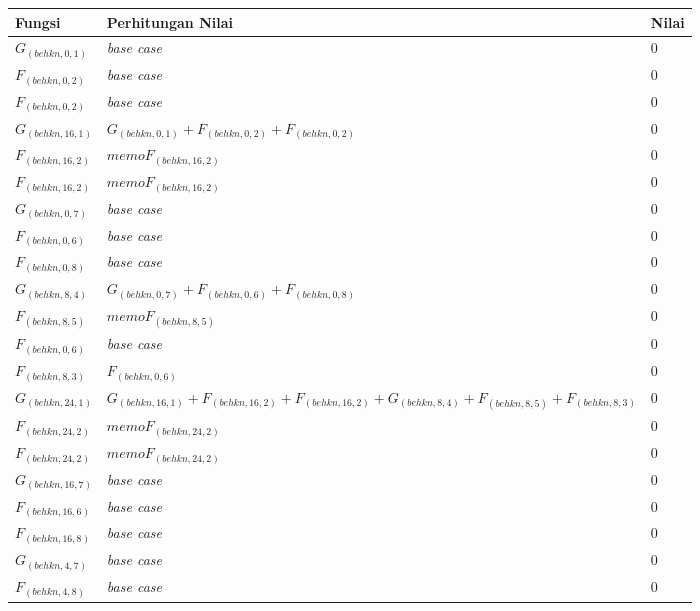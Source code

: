 \begin{appendices}
  \begin{table}[H]
  	\centering
  	\begin{tabular} {|p{3cm}|p{5cm}|p{1cm}|} \hline
  		Fungsi & Perhitungan Nilai & Nilai \\ \hline
  		$ G_{(behkn, 0, 1)} $ & \textit{base case} & $ 0 $ \\ \hline
  		$ F_{(behkn, 0, 2)} $ & \textit{base case} & $ 0 $ \\ \hline
  		$ F_{(behkn, 0, 2)} $ & \textit{base case} & $ 0 $ \\ \hline
  		$ G_{(behkn, 16, 1)}  $ & $G_{(behkn, 0, 1)} + F_{(behkn, 0, 2)} + F_{(behkn, 0, 2)}$ & $ 0 $ \\ \hline
  		$ F_{(behkn, 16, 2)}  $ & $memoF_{(behkn, 16, 2)}$ & $ 0 $ \\ \hline
  		$ F_{(behkn, 16, 2)}  $ & $memoF_{(behkn, 16, 2)}$ & $ 0 $ \\ \hline
  		$ G_{(behkn, 0, 7)} $ & \textit{base case} & $ 0 $ \\ \hline
  		$ F_{(behkn, 0, 6)} $ & \textit{base case} & $ 0 $ \\ \hline
  		$ F_{(behkn, 0, 8)} $ & \textit{base case} & $ 0 $ \\ \hline
  		$ G_{(behkn, 8, 4)}  $ & $G_{(behkn, 0, 7)} + F_{(behkn, 0, 6)} + F_{(behkn, 0, 8)}$ & $ 0 $ \\ \hline
  		$ F_{(behkn, 8, 5)}  $ & $memoF_{(behkn, 8, 5)}$ & $ 0 $ \\ \hline
  		$ F_{(behkn, 0, 6)} $ & \textit{base case} & $ 0 $ \\ \hline
  		$ F_{(behkn, 8, 3)}  $ & $F_{(behkn, 0, 6)}$ & $ 0 $ \\ \hline
  		$ G_{(behkn, 24, 1)}  $ & $G_{(behkn, 16, 1)} + F_{(behkn, 16, 2)} + F_{(behkn, 16, 2)} + G_{(behkn, 8, 4)} + F_{(behkn, 8, 5)} + F_{(behkn, 8, 3)}$ & $ 0 $ \\ \hline
  		$ F_{(behkn, 24, 2)}  $ & $memoF_{(behkn, 24, 2)}$ & $ 0 $ \\ \hline
  		$ F_{(behkn, 24, 2)}  $ & $memoF_{(behkn, 24, 2)}$ & $ 0 $ \\ \hline
  		$ G_{(behkn, 16, 7)} $ & \textit{base case} & $ 0 $ \\ \hline
  		$ F_{(behkn, 16, 6)} $ & \textit{base case} & $ 0 $ \\ \hline
  		$ F_{(behkn, 16, 8)} $ & \textit{base case} & $ 0 $ \\ \hline
  		$ G_{(behkn, 4, 7)} $ & \textit{base case} & $ 0 $ \\ \hline
  		$ F_{(behkn, 4, 8)} $ & \textit{base case} & $ 0 $ \\ \hline

\end{tabular}
\end{table}
\end{appendices}
